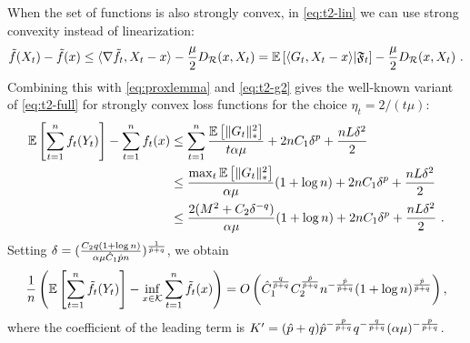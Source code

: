 When the set of functions is also strongly convex, in \eqref{eq:t2-lin} we can use strong convexity instead of linearization:
\[
\tilde{f}(X_t) - \tilde{f}(x) \le \langle \nabla \tilde{f}_t,X_t-x \rangle - \frac{\mu}{2} D_{\mathcal{R}}(x,X_t) = \mathbb{E}\left[\langle  G_t,X_t-x \rangle| \mathfrak{F}_t\right] - \frac{\mu}{2} D_{\mathcal{R}}(x,X_t) ~.
\]
Combining this with \eqref{eq:proxlemma} and \eqref{eq:t2-g2} gives the well-known variant of \eqref{eq:t2-full} for strongly convex loss functions \citep{BaHaRa07} for the choice $\eta_t=2/(t\mu)$:
\begin{align*}
\mathbb{E}\left[\sum_{t=1}^n f_t(Y_t)\right]- \sum_{t=1}^n f_t(x) 
& \le \sum_{t=1}^n  \frac{\mathbb{E}\left[\|G_t\|_*^2\right]}{ t \alpha \mu} + 2 n C_1 \delta^{p} + \frac{n L \delta^2}{2} \\
&\le \frac{\max_t \mathbb{E}\left[\|G_t\|_*^2\right]}{\alpha \mu} (1+\log n) + 2 n C_1 \delta^{p} + \frac{n L \delta^2}{2} \\
&\le \frac{2(M^2 + C_2 \delta^{-q})}{\alpha \mu} (1+\log n)+  2 n C_1 \delta^{p} + \frac{n L \delta^2}{2}~.
\end{align*}
Setting $\delta=(\frac{C_2 q (1+\log n)}{\alpha \mu \hat{C}_1 \hat{p} n})^{\frac{1}{\hat{p}+q}}$, we obtain 
\begin{equation}
\label{eq:t2-sc}
\frac{1}{n}\left(\mathbb{E}\left[\sum_{t=1}^n \tilde{f}_t(Y_t)\right] - \inf_{x \in \mathcal{K}} \sum_{t=1}^n \tilde{f}_t(x)\right) 
= O\left(\hat{C}_1^{\frac{q}{\hat{p}+q}} C_2^{\frac{\hat{p}}{\hat{p}+q}} n^{-\frac{\hat{p}}{\hat{p}+q}} (1+\log n)^{\frac{\hat{p}}{\hat{p}+q}} \right),
\end{equation}
where the coefficient of the leading term is $K'=(\hat{p}+q)\hat{p}^{-\frac{\hat{p}}{\hat{p}+q}} q^{-\frac{q}{\hat{p}+q}} (\alpha \mu)^{-\frac{\hat{p}}{\hat{p}+q}}$.

